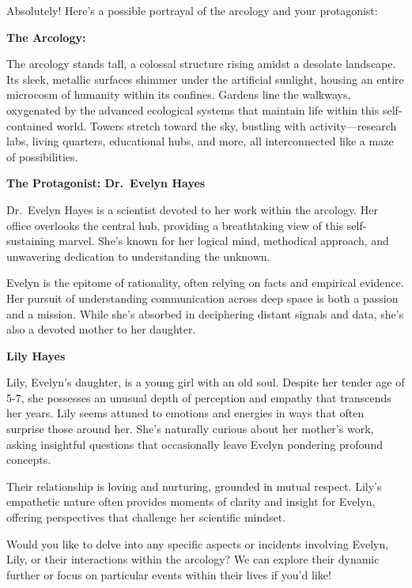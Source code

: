 \begin{aquote}
    Absolutely! Here's a possible portrayal of the arcology and your protagonist:\medskip

    \noindent\textbf{The Arcology:}

    The arcology stands tall, a colossal structure rising amidst a desolate landscape. Its sleek, metallic surfaces shimmer under the artificial sunlight, housing an entire microcosm of humanity within its confines. Gardens line the walkways, oxygenated by the advanced ecological systems that maintain life within this self-contained world. Towers stretch toward the sky, bustling with activity—research labs, living quarters, educational hubs, and more, all interconnected like a maze of possibilities.\medskip

    \noindent\textbf{The Protagonist: Dr.~Evelyn Hayes}

    Dr.~Evelyn Hayes is a scientist devoted to her work within the arcology. Her office overlooks the central hub, providing a breathtaking view of this self-sustaining marvel. She's known for her logical mind, methodical approach, and unwavering dedication to understanding the unknown.

    Evelyn is the epitome of rationality, often relying on facts and empirical evidence. Her pursuit of understanding communication across deep space is both a passion and a mission. While she's absorbed in deciphering distant signals and data, she's also a devoted mother to her daughter.\medskip

    \noindent\textbf{Lily Hayes}

    Lily, Evelyn's daughter, is a young girl with an old soul. Despite her tender age of 5-7, she possesses an unusual depth of perception and empathy that transcends her years. Lily seems attuned to emotions and energies in ways that often surprise those around her. She's naturally curious about her mother's work, asking insightful questions that occasionally leave Evelyn pondering profound concepts.

    Their relationship is loving and nurturing, grounded in mutual respect. Lily's empathetic nature often provides moments of clarity and insight for Evelyn, offering perspectives that challenge her scientific mindset.

    Would you like to delve into any specific aspects or incidents involving Evelyn, Lily, or their interactions within the arcology? We can explore their dynamic further or focus on particular events within their lives if you'd like!
\end{aquote}

